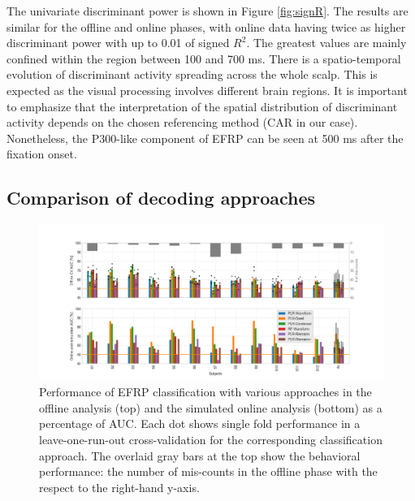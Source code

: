 \documentclass[12pt]{iopart}
\begin{document}
The univariate discriminant power is shown in Figure \ref{fig:signR}.
The results are similar for the offline and online phases, with online data having twice
as higher discriminant power with up to 0.01 of signed $R^2$.
The greatest values are mainly confined within the region between 100 and 700 ms.
There is a spatio-temporal evolution of discriminant activity spreading across the whole scalp. This is expected as the visual processing involves different brain regions. It is important to emphasize that the interpretation of the spatial distribution of discriminant activity depends on the chosen referencing method (CAR in our case). Nonetheless, the P300-like component of EFRP can be seen at 500 ms
after the fixation onset.



\subsection{Comparison of decoding approaches}
\label{sec:class}

\begin{figure}[!t]
    \includegraphics[trim={3cm 0cm 2cm 0cm},clip,width=1.1\columnwidth]{../images/Classification12_FixDurSep.png}
    \caption{Performance of EFRP classification with various approaches in the offline analysis (top)
    and the simulated online analysis (bottom) as a percentage of AUC.
    Each dot shows single fold performance
    in a leave-one-run-out cross-validation for the corresponding classification approach.
    The overlaid gray bars at the top show the behavioral performance:
    the number of mis-counts in the offline phase with the respect to the right-hand y-axis.}
\label{fig:classAll}
\end{figure}
\end{document}
